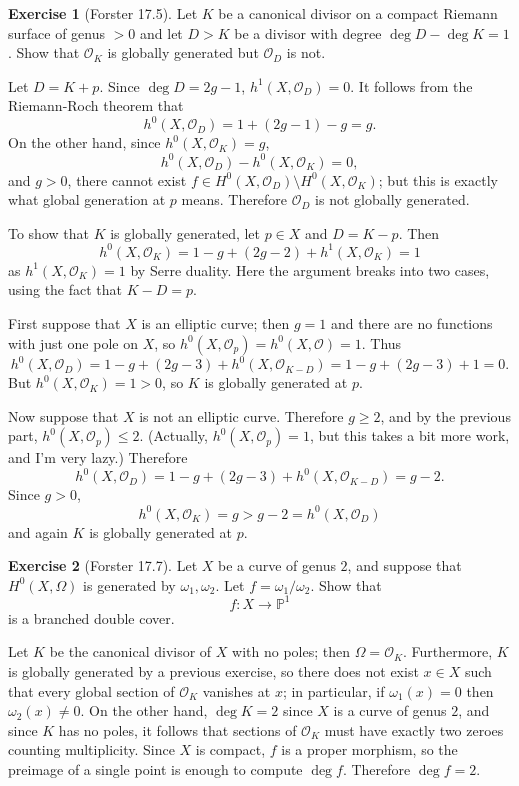 \documentclass[10pt]{article}
\newcommand{\PP}{\mathbb P}
\newcommand{\Olo}{\mathscr O}
\theoremstyle{definition}
\newtheorem{exer}{Exercise}
\begin{document}
\begin{exer}[Forster 17.5]
Let $K$ be a canonical divisor on a compact Riemann surface of genus $> 0$ and let $D > K$ be a divisor with degree $\deg D - \deg K = 1$.
Show that $\Olo_K$ is globally generated but $\Olo_D$ is not.
\end{exer}

Let $D = K + p$. Since $\deg D = 2g - 1$, $h^1(X, \Olo_D) = 0$.
It follows from the Riemann-Roch theorem that
$$h^0(X, \Olo_D) = 1 + (2g - 1) - g = g.$$
On the other hand, since $h^0(X, \Olo_K) = g$,
$$h^0(X, \Olo_D) - h^0(X, \Olo_K) = 0,$$
and $g > 0$, there cannot exist $f \in H^0(X, \Olo_D) \setminus H^0(X, \Olo_K)$; but this is exactly what global generation at $p$ means.
Therefore $\Olo_D$ is not globally generated.

To show that $K$ is globally generated, let $p \in X$ and $D = K - p$.
Then
$$h^0(X, \Olo_K) = 1 - g + (2g - 2) + h^1(X, \Olo_K) = 1$$
as $h^1(X, \Olo_K) = 1$ by Serre duality.
Here the argument breaks into two cases, using the fact that $K - D = p$.

First suppose that $X$ is an elliptic curve; then $g = 1$ and there are no functions with just one pole on $X$, so $h^0(X, \Olo_p) = h^0(X, \Olo) = 1$.
Thus
$$h^0(X, \Olo_D) = 1 - g + (2g - 3) + h^0(X, \Olo_{K - D}) = 1 - g + (2g - 3) + 1 = 0.$$
But $h^0(X, \Olo_K) = 1 > 0$, so $K$ is globally generated at $p$.

Now suppose that $X$ is not an elliptic curve. Therefore $g \geq 2$, and by the previous part, $h^0(X, \Olo_p) \leq 2$. (Actually, $h^0(X, \Olo_p) = 1$, but this takes a bit more work, and I'm very lazy.)
Therefore
$$h^0(X, \Olo_D) = 1 - g + (2g - 3) + h^0(X, \Olo_{K - D}) = g - 2.$$
Since $g > 0$,
$$h^0(X, \Olo_K) = g > g - 2 = h^0(X, \Olo_D)$$
and again $K$ is globally generated at $p$.

\begin{exer}[Forster 17.7]
Let $X$ be a curve of genus $2$, and suppose that $H^0(X, \Omega)$ is generated by $\omega_1,\omega_2$.
Let $f = \omega_1/\omega_2$. Show that
$$f: X \to \PP^1$$
is a branched double cover.
\end{exer}

Let $K$ be the canonical divisor of $X$ with no poles; then $\Omega = \Olo_K$.
Furthermore, $K$ is globally generated by a previous exercise, so there does not exist $x \in X$ such that every global section of $\Olo_K$ vanishes at $x$; in particular, if $\omega_1(x) = 0$ then $\omega_2(x) \neq 0$.
On the other hand, $\deg K = 2$ since $X$ is a curve of genus $2$, and since $K$ has no poles, it follows that sections of $\Olo_K$ must have exactly two zeroes counting multiplicity.
Since $X$ is compact, $f$ is a proper morphism, so the preimage of a single point is enough to compute $\deg f$.
Therefore $\deg f = 2$.
\end{document}
